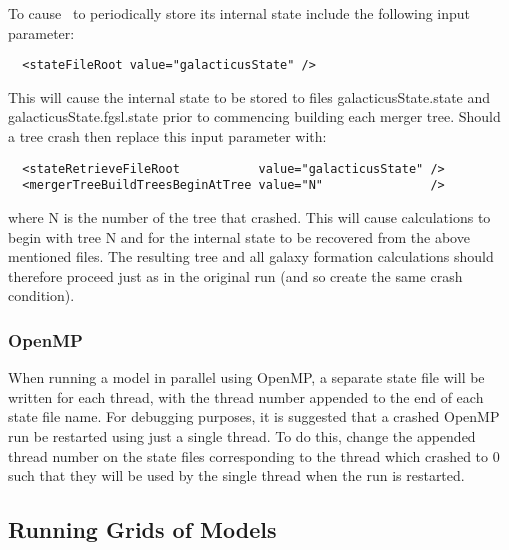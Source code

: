 To cause \glc\ to periodically store its internal state include the following input parameter:
\begin{verbatim}
  <stateFileRoot value="galacticusState" />
\end{verbatim}
This will cause the internal state to be stored to files {\normalfont \ttfamily galacticusState.state} and {\normalfont \ttfamily galacticusState.fgsl.state} prior to commencing building each merger tree. Should a tree crash then replace this input parameter with:
\begin{verbatim}
  <stateRetrieveFileRoot           value="galacticusState" />
  <mergerTreeBuildTreesBeginAtTree value="N"               />
\end{verbatim}
where {\normalfont \ttfamily N} is the number of the tree that crashed. This will cause calculations to begin with tree {\normalfont \ttfamily N} and for the internal state to be recovered from the above mentioned files. The resulting tree and all galaxy formation calculations should therefore proceed just as in the original run (and so create the same crash condition).

\subsubsection{OpenMP}

When running a model in parallel using OpenMP, a separate state file will be written for each thread, with the thread number appended to the end of each state file name. For debugging purposes, it is suggested that a crashed OpenMP run be restarted using just a single thread. To do this, change the appended thread number on the state files corresponding to the thread which crashed to 0 such that they will be used by the single thread when the run is restarted.

\subsection{Running Grids of Models}\label{sec:RunningGrids}

